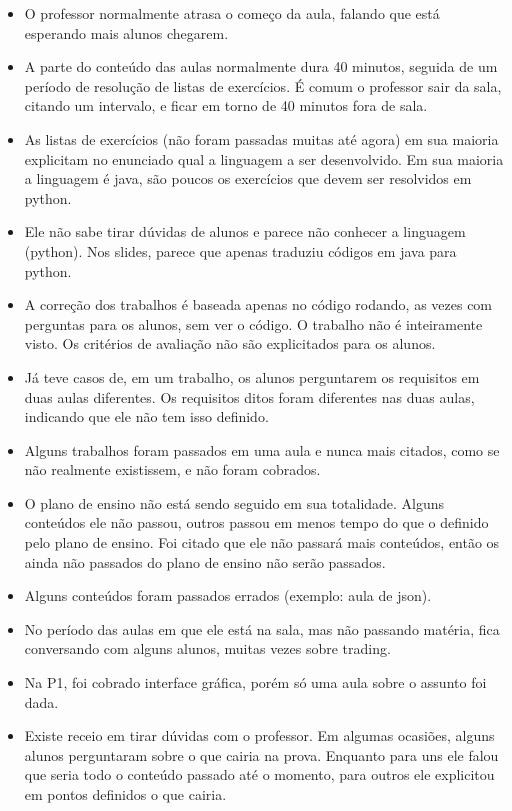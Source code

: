 \documentclass{ata-calico}
\begin{document}
\begin{itemize}
    \item O professor normalmente atrasa o começo da aula, falando que está esperando mais alunos chegarem.
    \item A parte do conteúdo das aulas normalmente dura 40 minutos, seguida de um período de resolução de listas de exercícios. É comum o professor sair da sala, citando um intervalo, e ficar em torno de 40 minutos fora de sala.
    \item As listas de exercícios (não foram passadas muitas até agora) em sua maioria explicitam no enunciado qual a linguagem a ser desenvolvido. Em sua maioria a linguagem é java, são poucos os exercícios que devem ser resolvidos em python.
    \item Ele não sabe tirar dúvidas de alunos e parece não conhecer a linguagem (python). Nos slides, parece que apenas traduziu códigos em java para python.
    \item A correção dos trabalhos é baseada apenas no código rodando, as vezes com perguntas para os alunos, sem ver o código. O trabalho não é inteiramente visto. Os critérios de avaliação não são explicitados para os alunos.
    \item Já teve casos de, em um trabalho, os alunos perguntarem os requisitos em duas aulas diferentes. Os requisitos ditos foram diferentes nas duas aulas, indicando que ele não tem isso definido.
    \item Alguns trabalhos foram passados em uma aula e nunca mais citados, como se não realmente existissem, e não foram cobrados.
    \item O plano de ensino não está sendo seguido em sua totalidade. Alguns conteúdos ele não passou, outros passou em menos tempo do que o definido pelo plano de ensino. Foi citado que ele não passará mais conteúdos, então os ainda não passados do plano de ensino não serão passados.
    \item Alguns conteúdos foram passados errados (exemplo: aula de json).
    \item No período das aulas em que ele está na sala, mas não passando matéria, fica conversando com alguns alunos, muitas vezes sobre trading.
    \item Na P1, foi cobrado interface gráfica, porém só uma aula sobre o assunto foi dada.
    \item Existe receio em tirar dúvidas com o professor. Em algumas ocasiões, alguns alunos perguntaram sobre o que cairia na prova. Enquanto para uns ele falou que seria todo o conteúdo passado até o momento, para outros ele explicitou em pontos definidos o que cairia.

\end{itemize}
\end{document}
